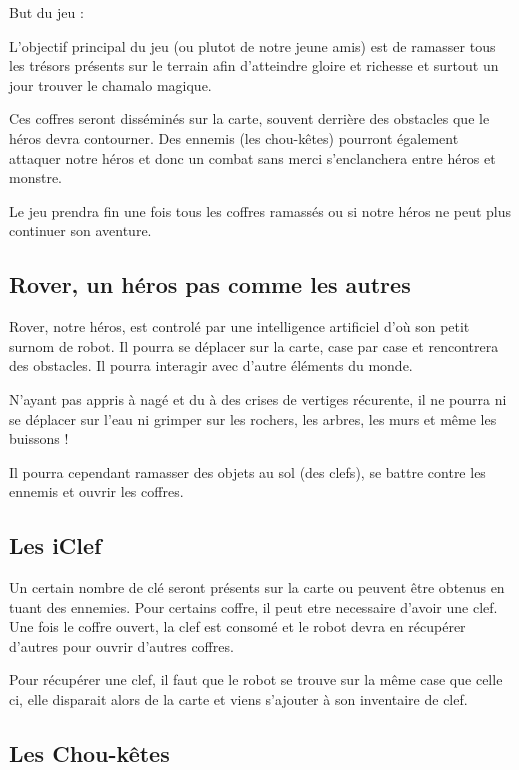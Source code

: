 \documentclass[a4paper 12pts]{article}
\begin{document}

But du jeu :

L'objectif  principal du jeu (ou plutot de notre jeune amis) est de ramasser tous les trésors présents 
sur le terrain afin d'atteindre gloire et richesse et surtout un jour trouver le chamalo magique.

Ces coffres seront disséminés sur la carte, souvent derrière des obstacles que le héros devra contourner. 
Des ennemis (les chou-kêtes) pourront également attaquer notre héros et donc un combat sans merci s'enclanchera entre héros et monstre.

Le jeu prendra fin une fois tous les coffres ramassés ou si notre héros ne peut plus continuer son aventure.


\subsection{Rover, un héros pas comme les autres}



Rover, notre héros, est controlé par une intelligence artificiel d'où son petit surnom de robot.
Il pourra se déplacer sur la carte, case par case et rencontrera des obstacles. 
Il pourra interagir avec d'autre éléments du monde. 

N'ayant pas appris à nagé et du à des crises de vertiges récurente, il ne pourra ni se déplacer sur l'eau ni grimper sur les rochers,
les arbres, les murs et même les buissons !

Il pourra cependant ramasser des objets au sol (des clefs), se battre contre les ennemis et ouvrir les coffres. 

\subsection{Les iClef}


Un certain nombre de clé seront présents sur la carte ou peuvent être obtenus en tuant des ennemies.
Pour certains coffre, il peut etre necessaire d'avoir une clef. 
Une fois le coffre ouvert, la clef est consomé et le robot devra en récupérer d'autres pour ouvrir d'autres coffres.

Pour récupérer une clef, il faut que le robot se trouve sur la même case que celle ci, elle disparait alors de la carte et 
viens s'ajouter à son inventaire de clef.

\subsection{Les Chou-kêtes}
\end{document}
